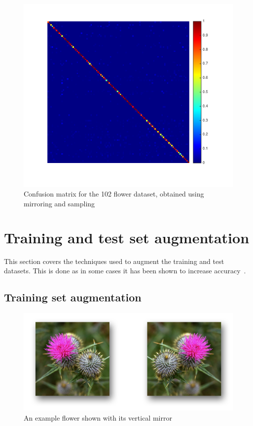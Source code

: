 \documentclass[11pt, a4paper]{report}
\begin{document}
\begin{figure}[hbt]
	\centering
  \includegraphics[totalheight=10cm]{img/32.png}
  \caption{Confusion matrix for the 102 flower dataset, obtained using mirroring and sampling}
  \label{img:32}
\end{figure}






\section{Training and test set augmentation}
\label{sec:augmentation}

This section covers the techniques used to augment the training and test datasets. This is done as in some cases it has been shown to increase accuracy~\cite{Chatfield14}.

\subsection{Training set augmentation}
\label{sec:train_augmentation}

\begin{figure}[hbt]
	\centering
  \includegraphics[totalheight=4cm]{img/09.png}
  \caption{An example flower shown with its vertical mirror}
  \label{img:09}
\end{figure}
\end{document}
